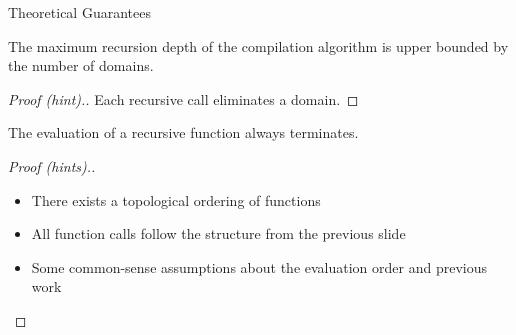 \documentclass{beamer}
\begin{document}
\begin{frame}{Theoretical Guarantees}
  \begin{theorem}
    The maximum \alert{recursion depth} of the compilation algorithm is upper
    bounded by the \alert{number of domains}.
  \end{theorem}
  \pause
  \begin{proof}[Proof (hint).]
    Each recursive call eliminates a domain.
  \end{proof}
  \pause
  \begin{theorem}
    The \alert{evaluation} of a recursive function always \alert{terminates}.
  \end{theorem}
  \pause
  \begin{proof}[Proof (hints).]
    \begin{itemize}
      \item There exists a \alert{topological ordering} of functions
      \item All function calls follow the \alert{structure} from the previous
            slide
      \item Some common-sense assumptions about the \alert{evaluation order} and
            previous work
    \end{itemize}
  \end{proof}
\end{frame}
\end{document}
